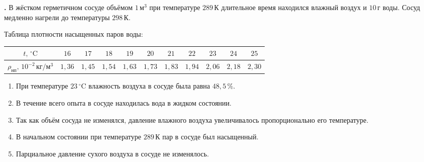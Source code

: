 \documentclass[12pt,a4paper]{article}
\newif\ifShowSolutions
\newcounter{banktask}
\newcommand{\BankTask}[3]{%
  \refstepcounter{banktask}%
  \Needspace{35mm}\par\medskip\noindent\begin{minipage}{\linewidth}%
  \noindent\textbf{\thebanktask.}\quad #2\par
  \ifShowSolutions
    #3\par
    \ifdefined\TutorEdition
      \ifcsname TutorSource#1\endcsname
        \smallskip{\small\csname TutorSource#1\endcsname\par}%
      \fi
    \fi
  \fi
  \end{minipage}\par\medskip
}
\begin{document}
\BankTask{6ECE95}{
В жёстком герметичном сосуде объёмом \(1\,\text{м}^{3}\) при температуре \(289\,\text{К}\) длительное время находился влажный воздух и \(10\,\text{г}\) воды. Сосуд медленно нагрели до температуры \(298\,\text{К}\).

Таблица плотности насыщенных паров воды:
\begin{center}
\begin{tabular}{|c|c|c|c|c|c|c|c|c|c|c|}
\hline
$t,\,{}^\circ\text{C}$ & $16$ & $17$ & $18$ & $19$ & $20$ & $21$ & $22$ & $23$ & $24$ & $25$ \\
\hline
$\rho_{\text{нп}},\,10^{-2}\,\text{кг}/\text{м}^3$ & $1{,}36$ & $1{,}45$ & $1{,}54$ & $1{,}63$ & $1{,}73$ & $1{,}83$ & $1{,}94$ & $2{,}06$ & $2{,}18$ & $2{,}30$ \\
\hline
\end{tabular}
\end{center}
\begin{enumerate}
\item При температуре \(23\,^{\circ}\mathrm{C}\) влажность воздуха в сосуде была равна \(48{,}5\,\%\).
\item В течение всего опыта в сосуде находилась вода в жидком состоянии.
\item Так как объём сосуда не изменялся, давление влажного воздуха увеличивалось пропорционально его температуре.
\item В начальном состоянии при температуре \(289\,\text{К}\) пар в сосуде был насыщенный.
\item Парциальное давление сухого воздуха в сосуде не изменялось.
\end{enumerate}
}{
\smallskip\noindent\textbf{Решение от GPT}\par
Начальная температура \(t_1=16\,^{\circ}\mathrm{C}\), конечная \(t_2=25\,^{\circ}\mathrm{C}\). Вначале пар насыщенный, поскольку длительное время находился в равновесии с жидкой водой. Его масса \(m_{\text{п}1}=\rho_{\text{нп}1}V=13{,}6\,\text{г}\). Общая масса воды и пара равна \(23{,}6\,\text{г}\). При \(25\,^{\circ}\mathrm{C}\) для насыщения требуется \(23{,}0\,\text{г}\) пара, поэтому остаётся \(0{,}6\,\text{г}\) жидкости.

1) Неверно: при \(23\,^{\circ}\mathrm{C}\) жидкость ещё есть, пар насыщенный, \(\varphi=100\,\%\).

2) Верно: жидкая вода сохраняется даже при конечной температуре.

3) Неверно: при испарении количество вещества газовой смеси увеличивается, поэтому её давление не пропорционально абсолютной температуре.

4) Верно: начальный пар насыщенный.

5) Неверно: \(p_{\text{сух}}=\nu_{\text{сух}}RT/V\), поэтому \(p_{\text{сух}2}/p_{\text{сух}1}=298/289>1\).

Ответ: \(24\).
}
\end{document}
